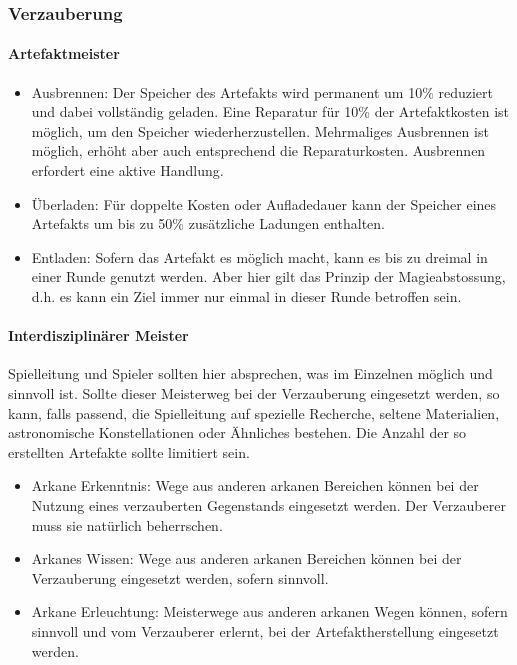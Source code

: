 \documentclass{article}
\begin{document}
\subsubsection{Verzauberung}

\paragraph{Artefaktmeister}

\begin{itemize}
\item Ausbrennen: Der Speicher des Artefakts wird permanent um 10\% reduziert und dabei vollständig geladen. Eine Reparatur für 10\% der Artefaktkosten ist möglich, um den Speicher wiederherzustellen. Mehrmaliges Ausbrennen ist möglich, erhöht aber auch entsprechend die Reparaturkosten. Ausbrennen erfordert eine aktive Handlung.
\item Überladen: Für doppelte Kosten oder Aufladedauer kann der Speicher eines Artefakts um bis zu 50\% zusätzliche Ladungen enthalten.
\item Entladen: Sofern das Artefakt es möglich macht, kann es bis zu dreimal in einer Runde genutzt werden. Aber hier gilt das Prinzip der Magieabstossung, d.h. es kann ein Ziel immer nur einmal in dieser Runde betroffen sein.
\end{itemize}

\paragraph{Interdisziplinärer Meister}

Spielleitung und Spieler sollten hier absprechen, was im Einzelnen möglich und sinnvoll ist. Sollte dieser Meisterweg
bei der Verzauberung eingesetzt werden, so kann, falls passend, die Spielleitung auf spezielle Recherche, seltene
Materialien, astronomische Konstellationen oder Ähnliches bestehen. Die Anzahl der so erstellten Artefakte sollte
limitiert sein.

\begin{itemize}
\item Arkane Erkenntnis: Wege aus anderen arkanen Bereichen können bei der Nutzung eines verzauberten Gegenstands eingesetzt werden. Der Verzauberer muss sie natürlich beherrschen.
\item Arkanes Wissen: Wege aus anderen arkanen Bereichen können bei der Verzauberung eingesetzt werden, sofern sinnvoll.
\item Arkane Erleuchtung: Meisterwege aus anderen arkanen Wegen können, sofern sinnvoll und vom Verzauberer erlernt, bei der Artefaktherstellung eingesetzt werden.
\end{itemize}
\end{document}
